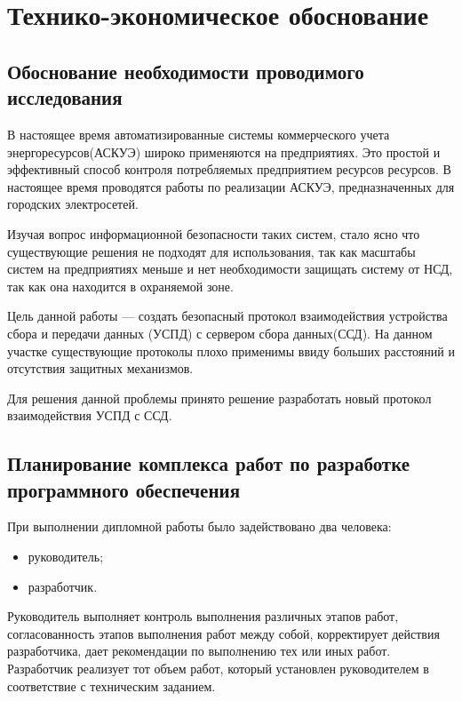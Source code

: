 \newpage
\section{Технико-экономическое обоснование}
\setcounter{figure}{0}

\subsection{Обоснование необходимости проводимого исследования}

В настоящее время автоматизированные системы коммерческого учета энергоресурсов(АСКУЭ) широко применяются на предприятиях. Это простой и эффективный способ контроля потребляемых предприятием ресурсов ресурсов. В настоящее время проводятся работы по реализации АСКУЭ, предназначенных для городских электросетей.

Изучая вопрос информационной безопасности таких систем, стало ясно
что существующие решения не подходят для использования, так как масштабы систем на предприятиях меньше и нет необходимости защищать систему от НСД, так как она находится в охраняемой зоне.

Цель данной работы — создать безопасный протокол взаимодействия устройства сбора и передачи данных (УСПД) с сервером сбора данных(ССД). На данном участке существующие протоколы плохо применимы ввиду больших расстояний и отсутствия защитных механизмов.

Для решения данной проблемы принято решение разработать новый протокол взаимодействия УСПД с ССД.

\subsection{Планирование комплекса работ по разработке программного обеспечения}

При выполнении дипломной работы было задействовано два человека:

\begin{itemize}
 \item руководитель;
 \item разработчик.
\end{itemize}

Руководитель выполняет контроль выполнения различных этапов работ, согласованность этапов выполнения работ между собой, корректирует действия разработчика, дает рекомендации по выполнению тех или иных работ. Разработчик реализует тот объем работ, который установлен руководителем в соответствие с техническим заданием.

